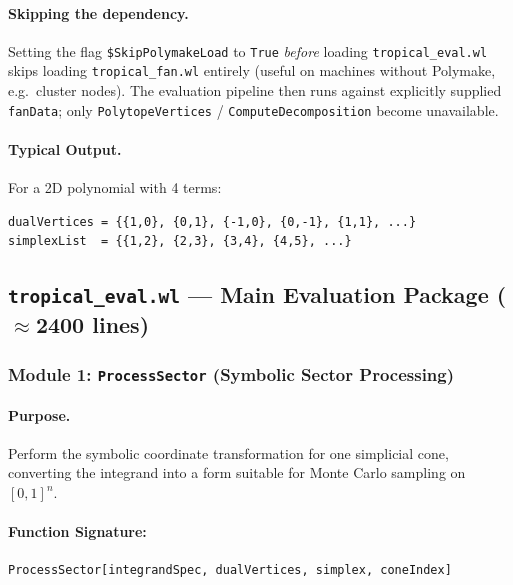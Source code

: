 \documentclass[11pt,a4paper]{article}
\begin{document}
\paragraph{Skipping the dependency.} Setting the flag \texttt{\$SkipPolymakeLoad} to \texttt{True} \emph{before} loading \texttt{tropical\_eval.wl} skips loading \texttt{tropical\_fan.wl} entirely (useful on machines without Polymake, e.g.\ cluster nodes). The evaluation pipeline then runs against explicitly supplied \texttt{fanData}; only \texttt{PolytopeVertices} / \texttt{ComputeDecomposition} become unavailable.

\paragraph{Typical Output.}
For a 2D polynomial with 4 terms:
\begin{lstlisting}
dualVertices = {{1,0}, {0,1}, {-1,0}, {0,-1}, {1,1}, ...}
simplexList  = {{1,2}, {2,3}, {3,4}, {4,5}, ...}
\end{lstlisting}

\subsection{\texttt{tropical\_eval.wl} --- Main Evaluation Package ($\approx$2400 lines)}

\subsubsection{Module 1: \texttt{ProcessSector} (Symbolic Sector Processing)}

\paragraph{Purpose.} Perform the symbolic coordinate transformation for one simplicial cone, converting the integrand into a form suitable for Monte Carlo sampling on $[0,1]^n$.

\paragraph{Function Signature:}
\begin{lstlisting}
ProcessSector[integrandSpec, dualVertices, simplex, coneIndex]
\end{lstlisting}
\end{document}
